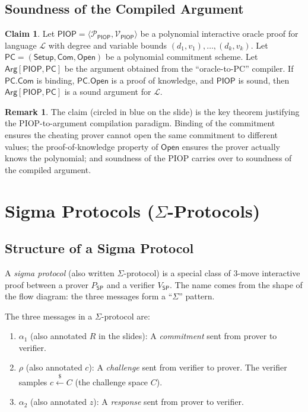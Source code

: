 \documentclass[11pt]{article}
\theoremstyle{plain}
\theoremstyle{definition}
\newtheorem{remark}[theorem]{Remark}
\newtheorem{claim}[theorem]{Claim}
\newcommand{\getsr}{\xleftarrow{\$}}
\begin{document}
\subsection{Soundness of the Compiled Argument}

\begin{claim}
Let $\mathsf{PIOP} = \langle \mathcal{P}_{\mathsf{PIOP}}, \mathcal{V}_{\mathsf{PIOP}} \rangle$ be a polynomial interactive oracle proof for language $\mathcal{L}$ with degree and variable bounds $(d_1, v_1), \ldots, (d_k, v_k)$. Let $\mathsf{PC} = (\mathsf{Setup}, \mathsf{Com}, \mathsf{Open})$ be a polynomial commitment scheme. Let $\mathsf{Arg}[\mathsf{PIOP}, \mathsf{PC}]$ be the argument obtained from the ``oracle-to-PC'' compiler. If $\mathsf{PC.Com}$ is binding, $\mathsf{PC.Open}$ is a proof of knowledge, and $\mathsf{PIOP}$ is sound, then $\mathsf{Arg}[\mathsf{PIOP}, \mathsf{PC}]$ is a sound argument for $\mathcal{L}$.
\end{claim}

\begin{remark}
The claim (circled in blue on the slide) is the key theorem justifying the PIOP-to-argument compilation paradigm. Binding of the commitment ensures the cheating prover cannot open the same commitment to different values; the proof-of-knowledge property of $\mathsf{Open}$ ensures the prover actually knows the polynomial; and soundness of the PIOP carries over to soundness of the compiled argument.
\end{remark}

\section{Sigma Protocols ($\Sigma$-Protocols)}

\subsection{Structure of a Sigma Protocol}

A \emph{sigma protocol} (also written $\Sigma$-protocol) is a special class of 3-move interactive proof between a prover $P_{\mathsf{SP}}$ and a verifier $V_{\mathsf{SP}}$. The name comes from the shape of the flow diagram: the three messages form a ``$\Sigma$'' pattern.

\medskip

The three messages in a $\Sigma$-protocol are:
\begin{enumerate}
  \item $\alpha_1$ (also annotated $R$ in the slides): A \emph{commitment} sent from prover to verifier.
  \item $\rho$ (also annotated $c$): A \emph{challenge} sent from verifier to prover. The verifier samples $c \getsr C$ (the challenge space $C$).
  \item $\alpha_2$ (also annotated $z$): A \emph{response} sent from prover to verifier.
\end{enumerate}
\end{document}
